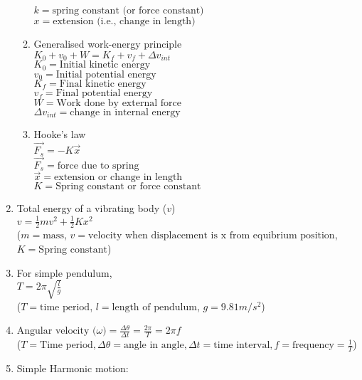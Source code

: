 \documentclass[12pt, letterpaper]{article}
\begin{document}
\begin{enumerate}
\begin{enumerate}
          $k = \text{spring constant (or force constant)}$\\
          $x = \text{extension (i.e., change in length)}$
          \item Generalised work-energy principle\\
          $K_0 + v_0 + W = K_f + v_f + \Delta v_{int}$\\
          $K_0 = \text{Initial kinetic energy}$\\
          $v_0 = \text{Initial potential energy}$\\
          $K_f = \text{Final kinetic energy}$\\
          $v_f = \text{Final potential energy}$\\
          $W = \text{Work done by external force}$\\
          $\Delta v_{int} = \text{change in internal energy}$
          \item Hooke's law\\
          $\overrightarrow {F_s} = -K \overrightarrow x$\\
          $\overrightarrow {F_s} = \text{force due to spring}$\\
          $\overrightarrow x = \text{extension or change in length}$\\
          $K = \text{Spring constant or force constant}$
        \end{enumerate}
        \item Total energy of a vibrating body ($v$)\\
          $v = \frac{1}{2} m v^2 + \frac{1}{2} K x^2$\\
          ($m = \text{mass}$, $v = \text{velocity when displacement is x from equibrium position}$, $K= \text{Spring constant}$)\\
        \item For simple pendulum,\\
          $T = 2 \pi \sqrt{\frac{l}{g}}$\\
          ($T = \text{time period}$, $l = \text{length of pendulum}$, $g = 9.81 m/s^2$)
        \item $\text{Angular velocity ($\omega$)} = \frac{\Delta \theta}{\Delta t} = \frac{2 \pi}{T} = 2 \pi f$\\
          ($T = \text{Time period}, \Delta \theta = \text{angle in angle}, \Delta t = \text{time interval}, f = \text{frequency} = \frac{1}{T}$)
        \item Simple Harmonic motion:\\

\end{enumerate}
\end{document}

